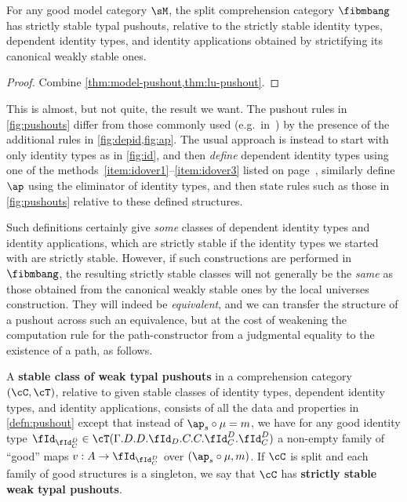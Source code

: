 \documentclass{amsart}
\let\C\cC
\let\T\cT
\let\Id\fId
\begin{document}
\begin{thm}
  For any good model category $\sM$, the split comprehension category $\fibmbang$ has strictly stable typal pushouts, relative to the strictly stable identity types, dependent identity types, and identity applications obtained by strictifying its canonical weakly stable ones.
\end{thm}
\begin{proof}
  Combine \cref{thm:model-pushout,thm:lu-pushout}.
\end{proof}

This is almost, but not quite, the result we want.
The pushout rules in \cref{fig:pushouts} differ from those commonly used (e.g.\ in~\cite{hottbook}) by the presence of the additional rules in \cref{fig:depid,fig:ap}.
The usual approach is instead to start with only identity types as in \cref{fig:id}, and then \emph{define} dependent identity types using one of the methods~\ref{item:idover1}--\ref{item:idover3} listed on page~\pageref{idover}, similarly define $\ap$ using the eliminator of identity types, and then state rules such as those in \ref{fig:pushouts} relative to these defined structures.

Such definitions certainly give \emph{some} classes of dependent identity types and identity applications, which are strictly stable if the identity types we started with are strictly stable.
However, if such constructions are performed in $\fibmbang$, the resulting strictly stable classes will not generally be the \emph{same} as those obtained from the canonical weakly stable ones by the local universes construction.
They will indeed be \emph{equivalent}, and we can transfer the structure of a pushout across such an equivalence, but at the cost of weakening the computation rule for the path-constructor from a judgmental equality to the existence of a path, as follows.

\begin{defn}\label{defn:wk-pushouts}
  A \textbf{stable class of weak typal pushouts} in a comprehension category $(\C,\T)$, relative to given stable classes of identity types, dependent identity types, and identity applications, consists of all the data and properties in \cref{defn:pushout} except that instead of $\ap_s\circ \mu = m$, we have for any good identity type $\Id_{\Id^D_C}\in\T(\Gamma.D.D.\Id_D.C.C.\Id^D_C.\Id^D_C)$ a non-empty family of ``good'' maps $v:A\to \Id_{\Id^D_C}$ over $(\ap_s\circ \mu, m)$.
  If $\C$ is split and each family of good structures is a singleton, we say that $\C$ has \textbf{strictly stable weak typal pushouts}.
\end{defn}
\end{document}
